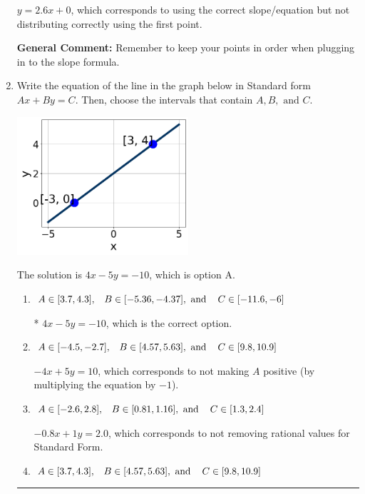 \documentclass{extbook}[14pt]
\newcommand{\litem}[1]{\item #1

\rule{\textwidth}{0.4pt}}
\begin{document}
\begin{enumerate}
{\begin{enumerate}[label=\Alph*.]
 $y = 2.6x + 0$, which corresponds to using the correct slope/equation but not distributing correctly using the first point.
\end{enumerate}

\textbf{General Comment:} Remember to keep your points in order when plugging in to the slope formula.
}
\litem{
Write the equation of the line in the graph below in Standard form $Ax+By=C$. Then, choose the intervals that contain $A, B, \text{ and } C$.

\begin{center}
    \includegraphics[width=0.5\textwidth]{../Figures/linearGraphToStandardA.png}
\end{center}


The solution is \( 4x - 5y = -10 \), which is option A.\begin{enumerate}[label=\Alph*.]
\item \( A \in [3.7, 4.3], \hspace{3mm} B \in [-5.36, -4.37], \text{ and } \hspace{3mm} C \in [-11.6, -6] \)

* $4x - 5y = -10$, which is the correct option.
\item \( A \in [-4.5, -2.7], \hspace{3mm} B \in [4.57, 5.63], \text{ and } \hspace{3mm} C \in [9.8, 10.9] \)

 $-4x + 5y = 10$, which corresponds to not making $A$ positive (by multiplying the equation by $-1$).
\item \( A \in [-2.6, 2.8], \hspace{3mm} B \in [0.81, 1.16], \text{ and } \hspace{3mm} C \in [1.3, 2.4] \)

 $-0.8x + 1y = 2.0$, which corresponds to not removing rational values for Standard Form.
\item \( A \in [3.7, 4.3], \hspace{3mm} B \in [4.57, 5.63], \text{ and } \hspace{3mm} C \in [9.8, 10.9] \)


\end{enumerate}}
\end{enumerate}
\end{document}

